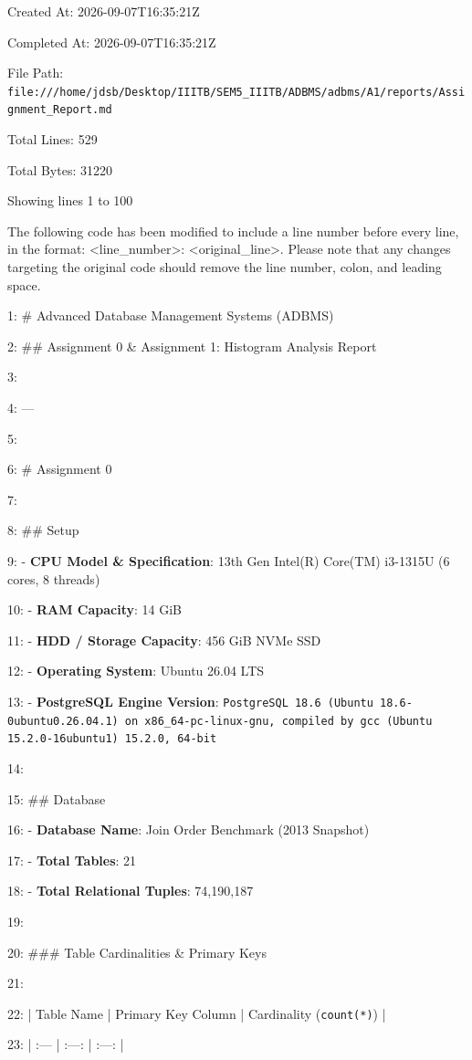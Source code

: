 \documentclass[11pt,a4paper]{article}
\begin{document}
Created At: 2026-09-07T16:35:21Z

Completed At: 2026-09-07T16:35:21Z

File Path: \texttt{file:///home/jdsb/Desktop/IIITB/SEM5\_IIITB/ADBMS/adbms/A1/reports/Assignment\_Report.md}

Total Lines: 529

Total Bytes: 31220

Showing lines 1 to 100

The following code has been modified to include a line number before every line, in the format: <line\_number>: <original\_line>. Please note that any changes targeting the original code should remove the line number, colon, and leading space.

1: \# Advanced Database Management Systems (ADBMS)

2: \#\# Assignment 0 \& Assignment 1: Histogram Analysis Report

3:

4: ---

5:

6: \# Assignment 0

7:

8: \#\# Setup

9: - \textbf{CPU Model \& Specification}: 13th Gen Intel(R) Core(TM) i3-1315U (6 cores, 8 threads)

10: - \textbf{RAM Capacity}: 14 GiB

11: - \textbf{HDD / Storage Capacity}: 456 GiB NVMe SSD

12: - \textbf{Operating System}: Ubuntu 26.04 LTS

13: - \textbf{PostgreSQL Engine Version}: \texttt{PostgreSQL 18.6 (Ubuntu 18.6-0ubuntu0.26.04.1) on x86\_64-pc-linux-gnu, compiled by gcc (Ubuntu 15.2.0-16ubuntu1) 15.2.0, 64-bit}

14:

15: \#\# Database

16: - \textbf{Database Name}: Join Order Benchmark (2013 Snapshot)

17: - \textbf{Total Tables}: 21

18: - \textbf{Total Relational Tuples}: 74,190,187

19:

20: \#\#\# Table Cardinalities \& Primary Keys

21:

22: | Table Name | Primary Key Column | Cardinality (\texttt{count(*)}) |

23: | :--- | :---: | :---: |
\end{document}
